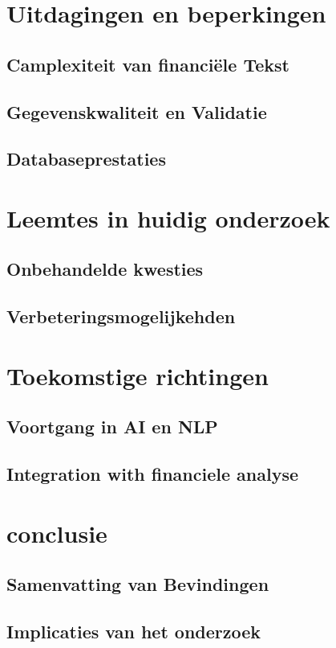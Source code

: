 \section{Uitdagingen en beperkingen}
\subsection{Camplexiteit van financiële Tekst}
\subsection{Gegevenskwaliteit en Validatie}
\subsection{Databaseprestaties}
\section{Leemtes in huidig onderzoek}
\subsection{Onbehandelde kwesties}
\subsection{Verbeteringsmogelijkehden}
\section{Toekomstige richtingen}
\subsection{Voortgang in AI en NLP}
\subsection{Integration with financiele analyse}
\section{conclusie}
\subsection{Samenvatting van Bevindingen}
\subsection{Implicaties van het onderzoek}